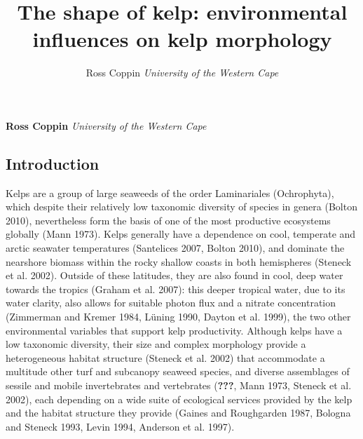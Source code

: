 \documentclass[10pt,a4,]{article}
\title{The shape of kelp: environmental influences on kelp morphology  }
\author{\Large Ross Coppin\vspace{0.05in} \newline\normalsize\emph{University of the Western Cape}  }
\date{}
\newcommand*{\authorfont}{\fontfamily{phv}\selectfont}
\begin{document}

{%
\setlength{\parindent}{0pt}
\thispagestyle{plain}
{\fontsize{18}{20}\selectfont\raggedright
\maketitle  %
}
{
   \vskip 13.5pt\relax \normalsize\fontsize{11}{12}
\textbf{\authorfont Ross Coppin} \hskip 15pt \emph{\small University of the Western Cape}   
}
}



\vskip 6.5pt

\noindent 

\newpage

\hypertarget{introduction}{%
\subsection{Introduction}\label{introduction}}

Kelps are a group of large seaweeds of the order Laminariales
(Ochrophyta), which despite their relatively low taxonomic diversity of
species in genera (Bolton 2010), nevertheless form the basis of one of
the most productive ecosystems globally (Mann 1973). Kelps generally
have a dependence on cool, temperate and arctic seawater temperatures
(Santelices 2007, Bolton 2010), and dominate the nearshore biomass
within the rocky shallow coasts in both hemispheres (Steneck et al.
2002). Outside of these latitudes, they are also found in cool, deep
water towards the tropics (Graham et al. 2007): this deeper tropical
water, due to its water clarity, also allows for suitable photon flux
and a nitrate concentration (Zimmerman and Kremer 1984, Lüning 1990,
Dayton et al. 1999), the two other environmental variables that support
kelp productivity. Although kelps have a low taxonomic diversity, their
size and complex morphology provide a heterogeneous habitat structure
(Steneck et al. 2002) that accommodate a multitude other turf and
subcanopy seaweed species, and diverse assemblages of sessile and mobile
invertebrates and vertebrates ({\textbf{???}}, Mann 1973, Steneck et al.
2002), each depending on a wide suite of ecological services provided by
the kelp and the habitat structure they provide (Gaines and Roughgarden
1987, Bologna and Steneck 1993, Levin 1994, Anderson et al. 1997).
\end{document}
